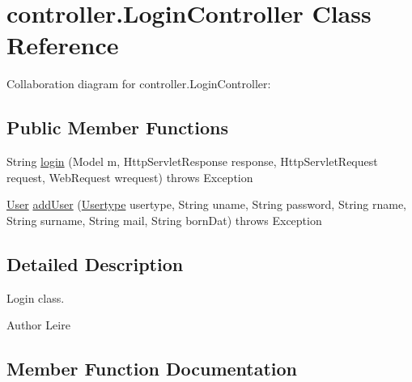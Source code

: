 \hypertarget{classcontroller_1_1_login_controller}{}\section{controller.\+Login\+Controller Class Reference}
\label{classcontroller_1_1_login_controller}


Collaboration diagram for controller.\+Login\+Controller\+:
\subsection*{Public Member Functions}
\begin{DoxyCompactItemize}
\item 
String \mbox{\hyperlink{classcontroller_1_1_login_controller_a98e670c0e2a6a391f1b5b9cb451aedeb}{login}} (Model m, Http\+Servlet\+Response response, Http\+Servlet\+Request request, Web\+Request wrequest)  throws Exception 
\item 
\mbox{\hyperlink{classentity_1_1_user}{User}} \mbox{\hyperlink{classcontroller_1_1_login_controller_a42297a84ac9029ac0d92530a62fa868b}{add\+User}} (\mbox{\hyperlink{classentity_1_1_usertype}{Usertype}} usertype, String uname, String password, String rname, String surname, String mail, String born\+Dat)  throws Exception 
\end{DoxyCompactItemize}


\subsection{Detailed Description}
Login class.

\begin{DoxyAuthor}{Author}
Leire 
\end{DoxyAuthor}


\subsection{Member Function Documentation}
\mbox{\label{classcontroller_1_1_login_controller_a42297a84ac9029ac0d92530a62fa868b}} 
